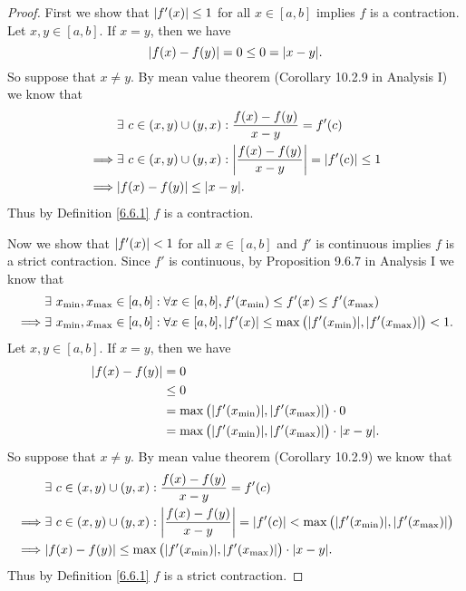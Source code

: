 \begin{proof}
    First we show that \(\left\lvert f'(x)\right\rvert \leq 1\) for all \(x \in [a, b]\) implies \(f\) is a contraction.
    Let \(x, y \in [a, b]\).
    If \(x = y\), then we have
    \[
        \abs{f(x) - f(y)} = 0 \leq 0 = \abs{x - y}.
    \]
    So suppose that \(x \neq y\).
    By mean value theorem (Corollary 10.2.9 in Analysis I) we know that
    \begin{align*}
                 & \exists\ c \in (x, y) \cup (y, x) : \frac{f(x) - f(y)}{x - y} = f'(c)                    \\
        \implies & \exists\ c \in (x, y) \cup (y, x) : \abs{\frac{f(x) - f(y)}{x - y}} = \abs{f'(c)} \leq 1 \\
        \implies & \abs{f(x) - f(y)} \leq \abs{x - y}.
    \end{align*}
    Thus by Definition \ref{6.6.1} \(f\) is a contraction.

    Now we show that \(\left\lvert f'(x)\right\rvert < 1\) for all \(x \in [a, b]\) and \(f'\) is continuous implies \(f\) is a strict contraction.
    Since \(f'\) is continuous, by Proposition 9.6.7 in Analysis I we know that
    \begin{align*}
                 & \exists\ x_{\min}, x_{\max} \in [a, b] : \forall x \in [a, b], f'(x_{\min}) \leq f'(x) \leq f'(x_{\max})                                  \\
        \implies & \exists\ x_{\min}, x_{\max} \in [a, b] : \forall x \in [a, b], \abs{f'(x)} \leq \max\big(\abs{f'(x_{\min})}, \abs{f'(x_{\max})}\big) < 1.
    \end{align*}
    Let \(x, y \in [a, b]\).
    If \(x = y\), then we have
    \begin{align*}
        \abs{f(x) - f(y)} & = 0                                                                       \\
                          & \leq 0                                                                    \\
                          & = \max\big(\abs{f'(x_{\min})}, \abs{f'(x_{\max})}\big) \cdot 0            \\
                          & = \max\big(\abs{f'(x_{\min})}, \abs{f'(x_{\max})}\big) \cdot \abs{x - y}.
    \end{align*}
    So suppose that \(x \neq y\).
    By mean value theorem (Corollary 10.2.9) we know that
    \begin{align*}
                 & \exists\ c \in (x, y) \cup (y, x) : \frac{f(x) - f(y)}{x - y} = f'(c)                                                                    \\
        \implies & \exists\ c \in (x, y) \cup (y, x) : \abs{\frac{f(x) - f(y)}{x - y}} = \abs{f'(c)} < \max\big(\abs{f'(x_{\min})}, \abs{f'(x_{\max})}\big) \\
        \implies & \abs{f(x) - f(y)} \leq \max\big(\abs{f'(x_{\min})}, \abs{f'(x_{\max})}\big) \cdot \abs{x - y}.
    \end{align*}
    Thus by Definition \ref{6.6.1} \(f\) is a strict contraction.
\end{proof}

